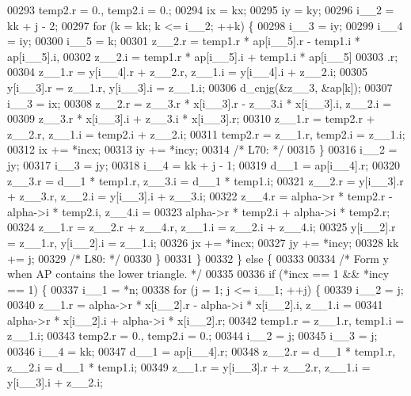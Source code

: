 \begin{DoxyCode}
00293         temp2.r = 0., temp2.i = 0.;
00294         ix = kx;
00295         iy = ky;
00296         i\_\_2 = kk + j - 2;
00297         \textcolor{keywordflow}{for} (k = kk; k <= i\_\_2; ++k) \{
00298             i\_\_3 = iy;
00299             i\_\_4 = iy;
00300             i\_\_5 = k;
00301             z\_\_2.r = temp1.r * ap[i\_\_5].r - temp1.i * ap[i\_\_5].i, 
00302                 z\_\_2.i = temp1.r * ap[i\_\_5].i + temp1.i * ap[i\_\_5]
00303                 .r;
00304             z\_\_1.r = y[i\_\_4].r + z\_\_2.r, z\_\_1.i = y[i\_\_4].i + z\_\_2.i;
00305             y[i\_\_3].r = z\_\_1.r, y[i\_\_3].i = z\_\_1.i;
00306             d\_cnjg(&z\_\_3, &ap[k]);
00307             i\_\_3 = ix;
00308             z\_\_2.r = z\_\_3.r * x[i\_\_3].r - z\_\_3.i * x[i\_\_3].i, z\_\_2.i =
00309                  z\_\_3.r * x[i\_\_3].i + z\_\_3.i * x[i\_\_3].r;
00310             z\_\_1.r = temp2.r + z\_\_2.r, z\_\_1.i = temp2.i + z\_\_2.i;
00311             temp2.r = z\_\_1.r, temp2.i = z\_\_1.i;
00312             ix += *incx;
00313             iy += *incy;
00314 \textcolor{comment}{/* L70: */}
00315         \}
00316         i\_\_2 = jy;
00317         i\_\_3 = jy;
00318         i\_\_4 = kk + j - 1;
00319         d\_\_1 = ap[i\_\_4].r;
00320         z\_\_3.r = d\_\_1 * temp1.r, z\_\_3.i = d\_\_1 * temp1.i;
00321         z\_\_2.r = y[i\_\_3].r + z\_\_3.r, z\_\_2.i = y[i\_\_3].i + z\_\_3.i;
00322         z\_\_4.r = alpha->r * temp2.r - alpha->i * temp2.i, z\_\_4.i = 
00323             alpha->r * temp2.i + alpha->i * temp2.r;
00324         z\_\_1.r = z\_\_2.r + z\_\_4.r, z\_\_1.i = z\_\_2.i + z\_\_4.i;
00325         y[i\_\_2].r = z\_\_1.r, y[i\_\_2].i = z\_\_1.i;
00326         jx += *incx;
00327         jy += *incy;
00328         kk += j;
00329 \textcolor{comment}{/* L80: */}
00330         \}
00331     \}
00332     \} \textcolor{keywordflow}{else} \{
00333 
00334 \textcolor{comment}{/*        Form  y  when AP contains the lower triangle. */}
00335 
00336     \textcolor{keywordflow}{if} (*incx == 1 && *incy == 1) \{
00337         i\_\_1 = *n;
00338         \textcolor{keywordflow}{for} (j = 1; j <= i\_\_1; ++j) \{
00339         i\_\_2 = j;
00340         z\_\_1.r = alpha->r * x[i\_\_2].r - alpha->i * x[i\_\_2].i, z\_\_1.i =
00341              alpha->r * x[i\_\_2].i + alpha->i * x[i\_\_2].r;
00342         temp1.r = z\_\_1.r, temp1.i = z\_\_1.i;
00343         temp2.r = 0., temp2.i = 0.;
00344         i\_\_2 = j;
00345         i\_\_3 = j;
00346         i\_\_4 = kk;
00347         d\_\_1 = ap[i\_\_4].r;
00348         z\_\_2.r = d\_\_1 * temp1.r, z\_\_2.i = d\_\_1 * temp1.i;
00349         z\_\_1.r = y[i\_\_3].r + z\_\_2.r, z\_\_1.i = y[i\_\_3].i + z\_\_2.i;

\end{DoxyCode}
